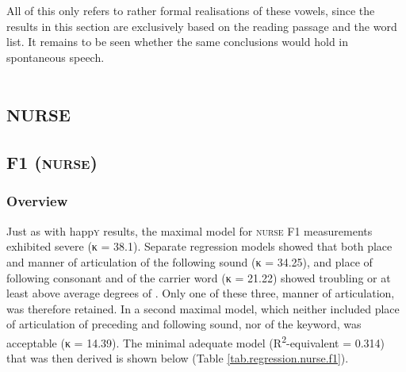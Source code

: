All of this only refers to rather formal realisations of these vowels, since the results in this section are exclusively based on the reading passage and the word list.
It remains to be seen whether the same conclusions would hold in spontaneous speech.

\section{\textrm{\textsc{nurse}}}
\label{sec.prod.res.vow.nurse}

\subsection{F1 (\textrm{\textsc{nurse}})}
\label{sec.prod.res.vow.nurse.f1}

\subsubsection{Overview}
\label{sec.prod.res.vow.nurse.f1.overview}

Just as with happ\textsc{y} results, the maximal model for \textsc{nurse} F1 measurements exhibited severe  (κ = 38.1).
Separate regression models showed that both place and manner of articulation of the following sound (κ = 34.25), and place of following consonant and  of the carrier word (κ = 21.22) showed troubling or at least above average degrees of .
Only one of these three, manner of articulation, was therefore retained.
In a second maximal model, which neither included place of articulation of preceding and following sound, nor  of the keyword,  was acceptable (κ = 14.39).
The minimal adequate model (R\textsuperscript{2}-equivalent = 0.314) that was then derived is shown below (Table \ref{tab.regression.nurse.f1}).

